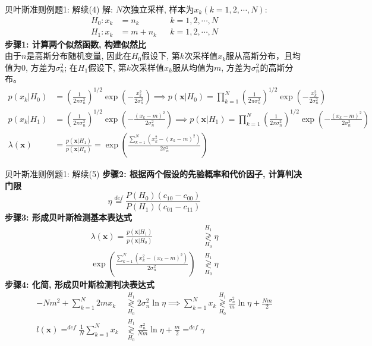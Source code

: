 \begin{frame}[shrink]{贝叶斯准则例题1: 解续(4)}
解: $N$次独立采样, 样本为$x_k(k=1,2,\cdots,N)$:
\begin{align*}
H_0: x_k&=n_k && k=1,2,\cdots,N\\
H_1: x_k&=m+n_k && k=1,2,\cdots,N
\end{align*}
\textbf{步骤1: 计算两个似然函数, 构建似然比}\\
由于$n$是高斯分布随机变量, 因此在$H_0$假设下, 第$k$次采样值$x_k$服从高斯分布，且均值为0, 方差为$\sigma_n^2$; 在$H_1$假设下, 第$k$次采样值$x_k$服从均值为$m$, 方差为$\sigma_n^2$的高斯分布。
\begin{align*}
p(x_k|H_0)&=\left(\frac{1}{2\pi\sigma_n^2}\right)^{1/2}\exp\left(-\frac{x_k^2}{2\sigma_n^2}\right)\implies p(\bm{x}|H_0)=\prod_{k=1}^{N}\left(\frac{1}{2\pi\sigma_n^2}\right)^{1/2}\exp\left(-\frac{x_k^2}{2\sigma_n^2}\right)\\
p(x_k|H_1)&=\left(\frac{1}{2\pi\sigma_n^2}\right)^{1/2}\exp\left(-\frac{(x_k-m)^2}{2\sigma_n^2}\right)\implies p(\bm{x}|H_1)=\prod_{k=1}^{N}\left(\frac{1}{2\pi\sigma_n^2}\right)^{1/2}\exp\left(-\frac{(x_k-m)^2}{2\sigma_n^2}\right)\\
\lambda(\bm{x})&=\frac{p(\bm{x}|H_1)}{p(\bm{x}|H_0)}=\exp\left(\frac{\sum\limits_{k=1}^{N}(x_k^2-(x_k-m)^2)}{2\sigma_n^2}\right)
\end{align*} 
\end{frame}

\begin{frame}[shrink]{贝叶斯准则例题1: 解续(5)}
\textbf{步骤2: 根据两个假设的先验概率和代价因子, 计算判决门限}
\[\eta\mathop{=}\limits^{def}\frac{P(H_0)(c_{10}-c_{00})}{P(H_1)(c_{01}-c_{11})} \]
\textbf{步骤3: 形成贝叶斯检测基本表达式}
\begin{align*}
\lambda(\bm{x})=\frac{p(\bm{x}|H_1)}{p(\bm{x}|H_0)}&\mathop{\gtrless}\limits_{H_0}^{H_1}\eta\\
\exp\left(\frac{\sum\limits_{k=1}^{N}(x_k^2-(x_k-m)^2)}{2\sigma_n^2}\right)&\mathop{\gtrless}\limits_{H_0}^{H_1}\eta
\end{align*} 
\textbf{步骤4: 化简, 形成贝叶斯检测判决表达式}
\begin{align*}
-Nm^2+\sum\limits_{k=1}^{N}2mx_k&\mathop{\gtrless}\limits_{H_0}^{H_1}2\sigma_n^2\ln\eta\implies \sum\limits_{k=1}^{N}x_k\mathop{\gtrless}\limits_{H_0}^{H_1}\frac{\sigma_n^2}{m}\ln\eta+\frac{Nm}{2}\\
l(\bm{x})\mathop{=}^{def}\frac{1}{N}\sum\limits_{k=1}^{N}x_k&\mathop{\gtrless}\limits_{H_0}^{H_1}\frac{\sigma_n^2}{Nm}\ln\eta+\frac{m}{2}\mathop{=}^{def}\gamma\\
\end{align*} 
\end{frame}


